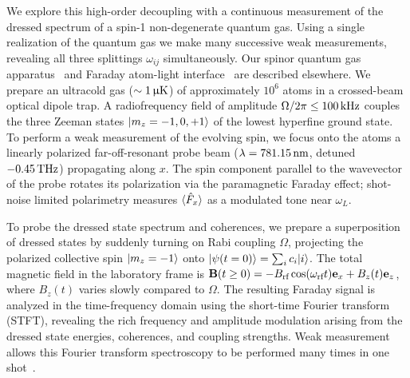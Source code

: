 \documentclass[aps,prl,reprint,superscriptaddress,floatfix]{revtex4-1}
\begin{document}
We explore this high-order decoupling with a continuous measurement of the dressed spectrum of a spin-1 non-degenerate quantum gas.
Using a single realization of the quantum gas we make many successive weak measurements, revealing all three splittings $\omega_{ij}$ simultaneously.
Our spinor quantum gas apparatus~\cite{wood_magnetic_2015} and Faraday atom-light interface~\cite{jasperse_magic-wavelength_2017} are described elsewhere.
We prepare an ultracold gas ($\sim \unit[1]{\upmu K}$) of approximately $10^6$ \Rb atoms in a crossed-beam optical dipole trap.
A radiofrequency field of amplitude $\Omega/2\pi \leq \unit[100]{kHz}$ couples the three Zeeman states $\vert m_z=-1,0,+1 \rangle $ of the lowest hyperfine ground state.
To perform a weak measurement of the evolving spin, we focus onto the atoms a linearly polarized far-off-resonant probe beam ($\lambda=\unit[781.15]{nm}$, detuned $-\unit[0.45]{THz}$) propagating along $x$.
The spin component parallel to the wavevector of the probe rotates its polarization via the paramagnetic Faraday effect; shot-noise limited polarimetry measures $\langle \hat{F}_x \rangle$ as a modulated tone near $\omega_L$.

To probe the dressed state spectrum and coherences, we prepare a superposition of dressed states by suddenly turning on Rabi coupling $\Omega$, projecting the polarized collective spin $\vert m_z=-1 \rangle $ onto $\vert \psi(t=0) \rangle  = \sum_i c_i \vert i \rangle $.
The total magnetic field in the laboratory frame is $\mathbf{B}(t \geq 0) = -B_{\text{rf}} \cos (\omega_{\text{rf}} t) \mathbf{e}_x + B_z(t) \mathbf{e}_z$, where $B_z(t)$ varies slowly compared to $\Omega$.
The resulting Faraday signal is analyzed in the time-frequency domain using the short-time Fourier transform (STFT), revealing the rich frequency and amplitude modulation arising from the dressed state energies, coherences, and coupling strengths.
Weak measurement allows this Fourier transform spectroscopy to be performed many times in one shot~\cite[cf.][]{valdes-curiel_fourier_2017}.
\end{document}
